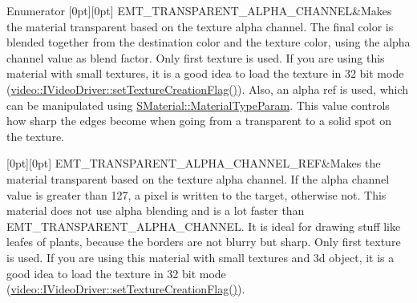 \begin{DoxyEnumFields}{Enumerator}
[0pt][0pt]{}\mbox{\label{namespaceirr_1_1video_ac8e9b6c66f7cebabd1a6d30cbc5430f1a9b136a4137789140813682f306847ecd}} 
E\+M\+T\+\_\+\+T\+R\+A\+N\+S\+P\+A\+R\+E\+N\+T\+\_\+\+A\+L\+P\+H\+A\+\_\+\+C\+H\+A\+N\+N\+EL&Makes the material transparent based on the texture alpha channel. The final color is blended together from the destination color and the texture color, using the alpha channel value as blend factor. Only first texture is used. If you are using this material with small textures, it is a good idea to load the texture in 32 bit mode (\hyperlink{classirr_1_1video_1_1IVideoDriver_a868b58a6b86b9e4841ca3879ce246c4e}{video\+::\+I\+Video\+Driver\+::set\+Texture\+Creation\+Flag()}). Also, an alpha ref is used, which can be manipulated using \hyperlink{classirr_1_1video_1_1SMaterial_aefe0acce491efa8dedcd2b7cb49f8133}{S\+Material\+::\+Material\+Type\+Param}. This value controls how sharp the edges become when going from a transparent to a solid spot on the texture. \\
\hline

[0pt][0pt]{}\mbox{\label{namespaceirr_1_1video_ac8e9b6c66f7cebabd1a6d30cbc5430f1a2cbc6ccd7b5a5438e69327663e57555f}} 
E\+M\+T\+\_\+\+T\+R\+A\+N\+S\+P\+A\+R\+E\+N\+T\+\_\+\+A\+L\+P\+H\+A\+\_\+\+C\+H\+A\+N\+N\+E\+L\+\_\+\+R\+EF&Makes the material transparent based on the texture alpha channel. If the alpha channel value is greater than 127, a pixel is written to the target, otherwise not. This material does not use alpha blending and is a lot faster than E\+M\+T\+\_\+\+T\+R\+A\+N\+S\+P\+A\+R\+E\+N\+T\+\_\+\+A\+L\+P\+H\+A\+\_\+\+C\+H\+A\+N\+N\+EL. It is ideal for drawing stuff like leafes of plants, because the borders are not blurry but sharp. Only first texture is used. If you are using this material with small textures and 3d object, it is a good idea to load the texture in 32 bit mode (\hyperlink{classirr_1_1video_1_1IVideoDriver_a868b58a6b86b9e4841ca3879ce246c4e}{video\+::\+I\+Video\+Driver\+::set\+Texture\+Creation\+Flag()}). \\
\hline


\end{DoxyEnumFields}
